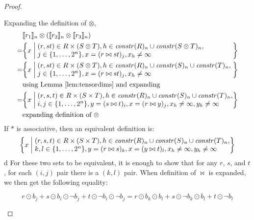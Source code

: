 \begin{proof}
\begin{description}
    Expanding the definition of $\otimes$,
%
    \begin{align*}
        & \interp{r_1}_n \otimes (\interp{r_2}_n \otimes \interp{r_3}_n) \\
      = & \bigg\{ x \; \bigg| \;
            \parbox{10cm}{
              $(r,st) \in R \times (S \otimes T),
               h \in \effdims{R}{n} \cup \effdims{S \otimes T}{n},$ \\
              $j \in \{ 1, \ldots, 2^n \},
                 x = (r \bowtie st)_j, x_h \neq \infty$
            } \bigg\} \\
      = & \bigg\{ x \; \bigg| \;
            \parbox{10cm}{
              $(r,st) \in R \times (S \otimes T),
               h \in \effdims{R}{n} \cup \effdims{S}{n} \cup \effdims{T}{n},$ \\
              $j \in \{ 1, \ldots, 2^n \},
                 x = (r \bowtie st)_j, x_h \neq \infty$
            } \bigg\} \\
        & \mbox{using Lemma~\ref{lem:tensordims} and expanding} \\
      = & \bigg\{ x \; \bigg| \;
            \parbox{10cm}{
              $(r,s,t) \in R \times (S \times T),
               h \in \effdims{R}{n} \cup \effdims{S}{n} \cup \effdims{T}{n},$ \\
              $i,j \in \{ 1, \ldots, 2^n \},
                y = (s \bowtie t)_i, x = (r \bowtie y)_j,
                x_h \neq \infty, y_h \neq \infty$
            } \bigg\} \\
        & \mbox{expanding definition of $\otimes$} \\
    \end{align*}
%
    If $\ast$ is associative, then an equivalent definition is:
    \begin{equation*}
          \bigg\{ x \; \bigg| \;
            \parbox{10cm}{
              $(r,s,t) \in R \times (S \times T),
               h \in \effdims{R}{n} \cup \effdims{S}{n} \cup \effdims{T}{n},$ \\
              $k,l \in \{ 1, \ldots, 2^n \},
                y = (r \bowtie s)_k, x = (y \bowtie t)_l,
                x_h \neq \infty, y_h \neq \infty$
            } \bigg\}
    \end{equation*}d
%
    For these two sets to be equivalent, it is enough to show that for any $r$,
    $s$, and $t$, for each $(i,j)$ pair there is a $(k,l)$ pair. When definition
    of $\bowtie$ is expanded, we then get the following equality:

    $$r \odot b_j + s \odot b_i \odot \neg b_j + t \odot \neg b_i \odot \neg b_j
    = r \odot b_k \odot b_l + s \odot \neg b_k \odot b_l + t \odot \neg b_l$$


\end{description}
\end{proof}
